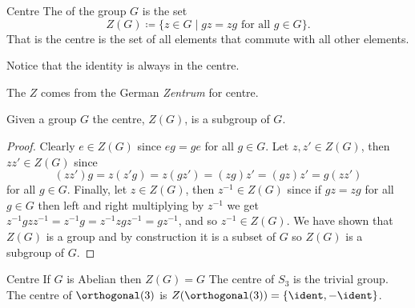 \begin{dfn}{Centre}{}
    The  of the group \(G\) is the set
    \begin{equation}
        Z(G) \coloneqq \{z \in G \mid gz = zg \text{ for all } g \in G\}.
    \end{equation}
    That is the centre is the set of all elements that commute with all other elements.
    
    \begin{rmk}
        Notice that the identity is always in the centre.
    \end{rmk}
    \begin{rmk}
        The \(Z\) comes from the German \textit{Zentrum} for centre.
    \end{rmk}
\end{dfn}

\begin{lma}{}{}
    Given a group \(G\) the centre, \(Z(G)\), is a subgroup of \(G\).
    \begin{proof}
        Clearly \(e \in Z(G)\) since \(eg = ge\) for all \(g \in G\).
        Let \(z, z' \in Z(G)\), then \(zz' \in Z(G)\) since 
        \begin{equation}
            (zz')g = z(z'g) = z(gz') = (zg)z' = (gz)z' = g(zz')
        \end{equation}
        for all \(g \in G\).
        Finally, let \(z \in Z(G)\), then \(z^{-1} \in Z(G)\) since if \(gz = zg\) for all \(g \in G\) then left and right multiplying by \(z^{-1}\) we get \(z^{-1}gzz^{-1} = z^{-1}g = z^{-1}zgz^{-1} = gz^{-1}\), and so \(z^{-1} \in Z(G)\).
        We have shown that \(Z(G)\) is a group and by construction it is a subset of \(G\) so \(Z(G)\) is a subgroup of \(G\).
    \end{proof}
\end{lma}

\begin{exm}{Centre}{}
    If \(G\) is Abelian then \(Z(G) = G\)
    The centre of \(S_3\) is the trivial group.
    The centre of \(\orthogonal(3)\) is \(Z(\orthogonal(3)) = \{\ident, -\ident\}\).
\end{exm}

